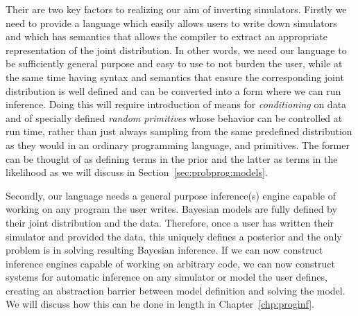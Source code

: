 Their are two key factors to realizing our aim of inverting simulators.  Firstly we need to provide a 
language which easily allows users to
write down simulators and which has semantics that allows the compiler to extract an appropriate
representation of the joint distribution.  In other words, we need our language to be sufficiently
general purpose and easy to use to not burden the user, while at the same time having syntax and semantics that
ensure the corresponding joint distribution is well defined and can be converted into a form where
we can run inference.  Doing this will require introduction of means for \emph{conditioning} on data
and of specially defined \emph{random primitives} whose behavior can be controlled at 
run time, rather than just always sampling from
the same predefined distribution as they would in an ordinary programming language, and primitives.  
The former can be thought of as defining terms in the prior and the
latter as terms in the likelihood as we will discuss in Section~\ref{sec:probprog:models}.

Secondly, our language needs a general purpose inference(s)
engine capable of working on any program the user writes.  Bayesian models are fully defined
by their joint distribution and the data.  Therefore, once a user has written their simulator and provided
the data, this uniquely defines a posterior and the only problem is in solving resulting Bayesian inference.
If we can now construct inference engines capable of working on arbitrary code, we can now 
construct systems for automatic inference on any simulator or model the user defines, creating an
abstraction barrier between model definition and solving the model.  We will discuss how this can be
done in length in Chapter~\ref{chp:proginf}.

